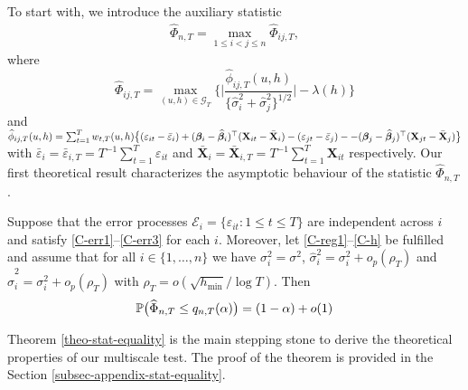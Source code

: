 \documentclass[a4paper,12pt]{article}
\newcommand{\doublehattwo}[1]{\widehat{\widehat{#1}}}
\begin{document}
To start with, we introduce the auxiliary statistic 
\begin{align}\label{Phi-hat-statistic}
\widehat{\Phi}_{n,T} = \max_{1 \le i < j \le n} \widehat{\Phi}_{ij,T},
\end{align}
where
\[ \widehat{\Phi}_{ij,T} = \max_{(u,h) \in \mathcal{G}_T} \Big\{ \Big| \frac{\widehat{\phi}_{ij,T}(u,h)} {\{ \widehat{\sigma}_i^2 + \widehat{\sigma}_j^2 \}^{1/2}} \Big| - \lambda(h) \Big \} \]
and $\widehat{\phi}_{ij,T}(u,h) = \sum_{t=1}^T w_{t,T}(u,h) \big\{ (\varepsilon_{it} - \bar{\varepsilon}_i) + (\bm{\beta}_i - \widehat{\bm{\beta}}_i)^\top (\mathbf{X}_{it} - \bar{\mathbf{X}}_{i}) - (\varepsilon_{jt} - \bar{\varepsilon}_j) - \linebreak - (\bm{\beta}_j - \widehat{\bm{\beta}}_j)^\top (\mathbf{X}_{jt} - \bar{\mathbf{X}}_{j}) \big\}$ with $\bar{\varepsilon}_i = \bar{\varepsilon}_{i,T} = T^{-1} \sum_{t=1}^T \varepsilon_{it}$ and $ \bar{\mathbf{X}}_{i} =  \bar{\mathbf{X}}_{i, T} = T^{-1}\sum_{t=1}^T  \mathbf{X}_{it}$ respectively. Our first theoretical result characterizes the asymptotic behaviour of the statistic $\widehat{\Phi}_{n,T}$. 
\begin{theorem}\label{theo-stat-equality}
Suppose that the error processes $\mathcal{E}_i = \{ \varepsilon_{it}: 1 \le t \le T \}$ are independent across $i$ and satisfy \ref{C-err1}--\ref{C-err3} for each $i$. Moreover, let \ref{C-reg1}--\ref{C-h} be fulfilled and assume that for all $i \in \{1, \ldots, n\}$ we have $\sigma_i^2 = \sigma^2$, $\widehat{\sigma}_i^2 = \sigma^2_i + o_p(\rho_T)$ and $\doublehattwo{\sigma}_i^2 = \sigma^2_i + o_p(\rho_T)$ with $\rho_T = o(\sqrt{h_{\min}}/\log T)$. Then 
\[ \mathbb{P} \big( \widehat{\Phi}_{n,T} \le q_{n,T}(\alpha) \big) = (1 - \alpha) + o(1) \]
\end{theorem}
Theorem \ref{theo-stat-equality} is the main stepping stone to derive the theoretical properties of our multiscale test. The proof of the theorem is provided in the Section \ref{subsec-appendix-stat-equality}.
\end{document}
